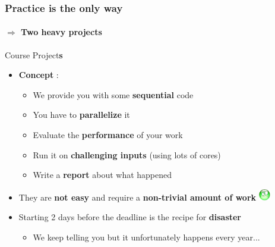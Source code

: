 \documentclass[10pt]{beamer}
\begin{document}
\begin{frame}
  \frametitle{\textbf{Practice} is the only way}
  \framesubtitle{$\Rightarrow$ Two heavy projects }
  \begin{block}{Course Project\textbf{s}}
    \begin{itemize}
      
    \item \textbf{Concept} :
      \begin{itemize}
      \item We provide you with some \textbf{sequential} code
      \item You have to \textbf{parallelize} it
      \item Evaluate the \textbf{performance} of your work
      \item Run it on \textbf{challenging inputs} (using lots of cores)
      \item Write a \textbf{report} about what happened
      \end{itemize}
  
      \medskip

    \item They are \textbf{not easy} and require a \textbf{non-trivial amount of work} \includegraphics[width=0.5cm,trim=0 17mm 0 0]{triste}
      
      \medskip
      
    \item Starting 2 days before the deadline is the recipe for \textbf{disaster}
      \begin{itemize}
      \item We keep telling you but it unfortunately happens every year...
      \end{itemize}
    \end{itemize}
  \end{block} 
\end{frame}

\end{document}
